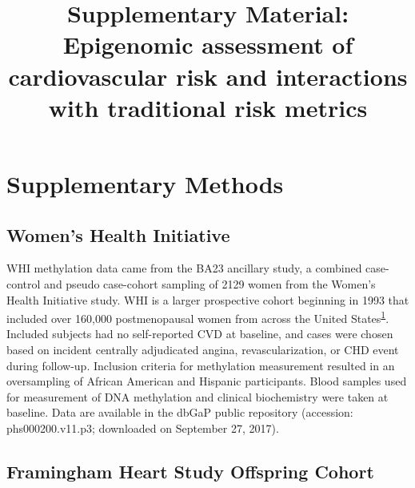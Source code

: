 \documentclass[]{article}
\title{Supplementary Material: Epigenomic assessment of cardiovascular risk and
interactions with traditional risk metrics}
\author{}
\date{}
\begin{document}
\maketitle

\newcommand{\beginsupplement}{
  \setcounter{table}{0}  
  \renewcommand{\thetable}{S\arabic{table}}
  \setcounter{figure}{0} 
  \renewcommand{\thefigure}{S\arabic{figure}}
}

\setcounter{table}{0}  
  \renewcommand{\thetable}{S\arabic{table}}
  \setcounter{figure}{0} 
  \renewcommand{\thefigure}{S\arabic{figure}}

\hypertarget{supplementary-methods}{%
\section{Supplementary Methods}\label{supplementary-methods}}

\hypertarget{womens-health-initiative}{%
\subsection{Women's Health Initiative}\label{womens-health-initiative}}

WHI methylation data came from the BA23 ancillary study, a combined
case-control and pseudo case-cohort sampling of 2129 women from the
Women's Health Initiative study. WHI is a larger prospective cohort
beginning in 1993 that included over 160,000 postmenopausal women from
across the United
States\textsuperscript{\protect\hyperlink{ref-Anderson1998}{1}}.
Included subjects had no self-reported CVD at baseline, and cases were
chosen based on incident centrally adjudicated angina,
revascularization, or CHD event during follow-up. Inclusion criteria for
methylation measurement resulted in an oversampling of African American
and Hispanic participants. Blood samples used for measurement of DNA
methylation and clinical biochemistry were taken at baseline. Data are
available in the dbGaP public repository (accession: phs000200.v11.p3;
downloaded on September 27, 2017).

\hypertarget{framingham-heart-study-offspring-cohort}{%
\subsection{Framingham Heart Study Offspring
Cohort}\label{framingham-heart-study-offspring-cohort}}
\end{document}

